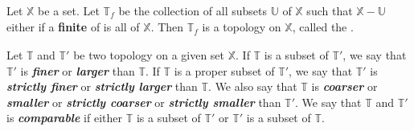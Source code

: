       \begin{definition}
            Let $ \mathbb{X} $ be a set. Let $ \mathbb{T}_{\mathit{f}} $ be the collection of all subsets $ \mathbb{U} $ of $ \mathbb{X} $ such that $ \mathbb{X} - \mathbb{U} $ either if a \textbf{finite}  of is all of $ \mathbb{X} $. Then $ \mathbb{T}_{\mathit{f}} $ is a topology on $ \mathbb{X} $, called the \textit{\textbf{}}.
      \end{definition}

      \begin{definition}
            Let $ \mathbb{T} $ and $ \mathbb{T'} $ be two topology on a given set $ \mathbb{X} $. If $ \mathbb{T} $ is  a subset of $ \mathbb{T'} $, we say that $ \mathbb{T'} $ is \textit{\textbf{finer}} or \textit{\textbf{larger}} than $ \mathbb{T} $. If $ \mathbb{T} $ is a proper subset of $ \mathbb{T'} $, we say that $ \mathbb{T'} $ is \textit{\textbf{strictly finer}} or \textit{\textbf{strictly larger}}  than $ \mathbb{T} $.
            We also say that $ \mathbb{T} $ is \textit{\textbf{coarser}} or \textit{\textbf{smaller}} or \textit{\textbf{strictly coarser}} or \textit{\textbf{strictly smaller}} than $ \mathbb{T'} $.
            We say that $ \mathbb{T} $ and $ \mathbb{T'} $ is \textit{\textbf{comparable}} if either $ \mathbb{T} $ is a subset of $ \mathbb{T'} $ or $ \mathbb{T'} $ is a subset of $ \mathbb{T} $.
      \end{definition}

